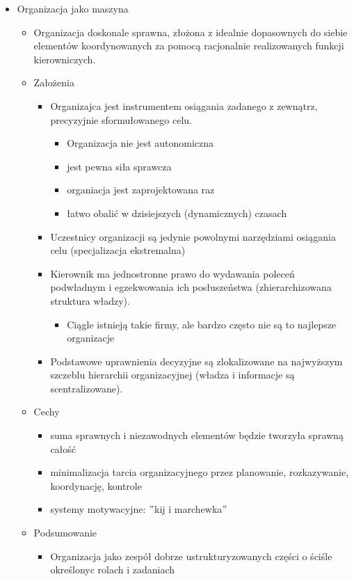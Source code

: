 \documentclass[a4paper,10pt]{report}
\begin{document}
\begin{itemize}
	\item Organizacja jako maszyna
	\begin{itemize}
		\item Organizacja doskonale sprawna, złożona z idealnie dopasownych do  siebie elementów koordynowanych za pomocą racjonalnie realizowanych funkcji kierowniczych.
		\item Założenia 
		\begin{itemize}
			\item Organizajca jest instrumentem osiągania zadanego z zewnątrz, precyzyjnie sformułowanego celu. 
			\begin{itemize}
				\item Organizacja nie jest autonomiczna
				\item jest pewna siła sprawcza
				\item organiacja jest zaprojektowana raz
				\item łatwo obalić w dzisiejszych (dynamicznych) czasach			
			\end{itemize}
			\item Uczestnicy organizacji są jedynie powolnymi narzędziami osiągania celu (specjalizacja ekstremalna)
			\item Kierownik ma jednostronne prawo do wydawania poleceń podwładnym i egzekwowania ich posłuszeństwa (zhierarchizowana struktura władzy).
			\begin{itemize}
				\item Ciągle istnieją takie firmy, ale bardzo często nie są to najlepsze organizacje
			\end{itemize}
			\item Podstawowe uprawnienia decyzyjne są zlokalizowane na najwyższym szczeblu hierarchii organizacyjnej (władza i informacje są scentralizowane).
		\end{itemize}
		\item Cechy
		\begin{itemize}
			\item suma sprawnych i niezawodnych elementów będzie tworzyła sprawną całość
			\item minimalizacja tarcia organizacyjnego przez planowanie, rozkazywanie, koordynację, kontrole
			\item systemy motywacyjne: $"$kij i marchewka$"$
		\end{itemize}
		\item Podsumowanie
		\begin{itemize}
			\item Organizacja jako zespół dobrze ustrukturyzowanych części o ściśle określonyc rolach i zadaniach

\end{itemize}
\end{itemize}
\end{itemize}
\end{document}

